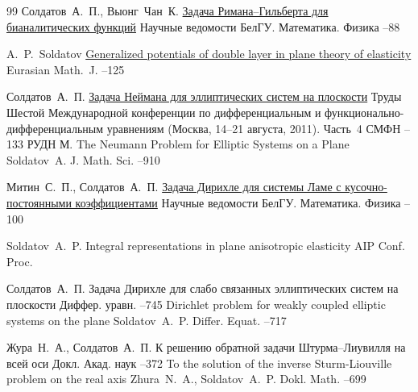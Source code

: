 \begin{thebibliography}{99}
\by Солдатов~А.~П., Выонг~Чан~К. 
\paper \href{https://elibrary.ru/item.asp?id=24194792}{Задача Римана--Гильберта для бианалитических функций}
\jour Научные ведомости БелГУ. Математика. Физика
–88 

\by A.~P.~Soldatov
\paper \href{http://mi.mathnet.ru/emj158}{Generalized potentials of double layer in plane theory of elasticity}
\jour Eurasian Math.~J.
--125

\by Солдатов~А.~П.
\paper \href{http://mi.mathnet.ru/cmfd244}{Задача Неймана для эллиптических систем на плоскости}
\inbook Труды Шестой Международной конференции по дифференциальным и функционально-дифференциальным уравнениям \rm (Москва, 14--21 августа, 2011). Часть~4
\serial СМФН
--133
\publ РУДН
\publaddr М.
\transl
\paper The Neumann Problem for Elliptic Systems on a Plane
\by Soldatov~A.
\jour J. Math. Sci.
--910


\by Митин~С.~П., Солдатов~А.~П.
\paper \href{https://elibrary.ru/item.asp?id=21639537}{Задача Дирихле для системы Ламе с кусочно-пос\-тоян\-ны\-ми коэффициентами}
\jour Научные ведомости БелГУ. Математика. Физика
--100 

\by Soldatov~A.~P.
\paper Integral representations in plane anisotropic elasticity
\jour AIP Conf. Proc. 

\by Солдатов~А.~П. 
\paper Задача Дирихле для слабо связанных эллиптических систем на плоскости
\jour Диффер. уравн.
--745
\transl
\paper Dirichlet problem for weakly coupled elliptic systems on the plane
\by Soldatov~A.~P.
\jour Differ. Equat.
--717

\by Жура~Н.~А., Солдатов~А.~П.
\paper К решению обратной задачи Штурма–Лиувилля на всей оси
\jour Докл. Акад. наук
–372 
\transl
\paper To the solution of the inverse Sturm-Liouville problem on the real axis
\by \linebreak Zhura~N.~A., Soldatov~A.~P.
\jour Dokl. Math. 
--699




\end{thebibliography}
